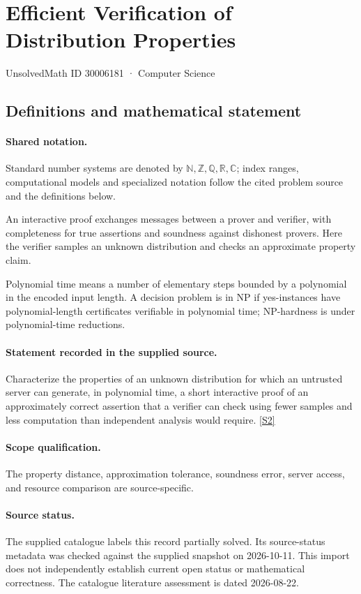 \documentclass[11pt]{article}
\newcommand{\sref}[2]{\hyperlink{source:#1:#2}{[S#2]}}
\begin{document}
\setcounter{section}{30006180}
\section{Efficient Verification of Distribution Properties}\label{30006181}
{\small\sffamily UnsolvedMath ID 30006181 · Computer Science}
\subsection{Definitions and mathematical statement}

\paragraph{Shared notation.}Standard number systems are denoted by $\mathbb N,\mathbb Z,\mathbb Q,\mathbb R,\mathbb C$; index ranges, computational models and specialized notation follow the cited problem source and the definitions below.


An interactive proof exchanges messages between a prover and verifier, with completeness for true assertions and soundness against dishonest provers. Here the verifier samples an unknown distribution and checks an approximate property claim.

Polynomial time means a number of elementary steps bounded by a polynomial in the encoded input length. A decision problem is in $\mathrm{NP}$ if yes-instances have polynomial-length certificates verifiable in polynomial time; NP-hardness is under polynomial-time reductions.
\paragraph{Statement recorded in the supplied source.}
Characterize the properties of an unknown distribution for which an untrusted server can generate, in polynomial time, a short interactive proof of an approximately correct assertion that a verifier can check using fewer samples and less computation than independent analysis would require. \sref{30006181}{2}
\paragraph{Scope qualification.}
The property distance, approximation tolerance, soundness error, server access, and resource comparison are source-specific.
\paragraph{Source status.}
The supplied catalogue labels this record partially solved. Its source-status metadata was checked against the supplied snapshot on 2026-10-11. This import does not independently establish current open status or mathematical correctness. The catalogue literature assessment is dated 2026-08-22.
\end{document}
